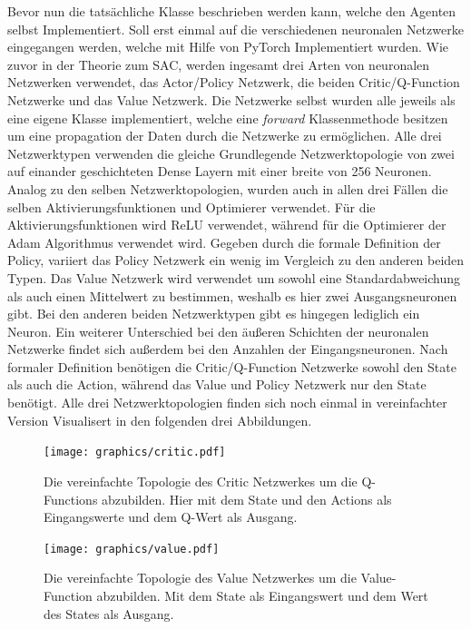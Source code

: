 \documentclass[]{iat}
\begin{document}
Bevor nun die tatsächliche Klasse beschrieben werden kann, welche den Agenten selbst Implementiert. Soll erst einmal auf die verschiedenen neuronalen Netzwerke eingegangen werden, welche mit Hilfe von PyTorch Implementiert wurden. Wie zuvor in der Theorie zum SAC, werden ingesamt drei Arten von neuronalen Netzwerken verwendet, das Actor/Policy Netzwerk, die beiden Critic/Q-Function Netzwerke und das Value Netzwerk. Die Netzwerke selbst wurden alle jeweils als eine eigene Klasse implementiert, welche eine \textit{forward} Klassenmethode besitzen um eine propagation der Daten durch die Netzwerke zu ermöglichen. Alle drei Netzwerktypen verwenden die gleiche Grundlegende Netzwerktopologie von zwei auf einander geschichteten Dense Layern mit einer breite von 256 Neuronen. Analog zu den selben Netzwerktopologien, wurden auch in allen drei Fällen die selben Aktivierungsfunktionen und Optimierer verwendet. Für die Aktivierungsfunktionen wird ReLU verwendet, während für die Optimierer der Adam Algorithmus \cite[]{kingma2014method} verwendet wird. Gegeben durch die formale Definition der Policy, variiert das Policy Netzwerk ein wenig im Vergleich zu den anderen beiden Typen. Das Value Netzwerk wird verwendet um sowohl eine Standardabweichung als auch einen Mittelwert zu bestimmen, weshalb es hier zwei Ausgangsneuronen gibt. Bei den anderen beiden Netzwerktypen gibt es hingegen lediglich ein Neuron. Ein weiterer Unterschied bei den äußeren Schichten der neuronalen Netzwerke findet sich außerdem bei den Anzahlen der Eingangsneuronen. Nach formaler Definition benötigen die Critic/Q-Function Netzwerke sowohl den State als auch die Action, während das Value und Policy Netzwerk nur den State benötigt. Alle drei Netzwerktopologien finden sich noch einmal in vereinfachter Version Visualisert in den folgenden drei Abbildungen.

\begin{figure}[H]
    \texttt{[image: graphics/critic.pdf]}
    \centering
    \caption{Die vereinfachte Topologie des Critic Netzwerkes um die Q-Functions abzubilden. Hier mit dem State und den Actions als Eingangswerte und dem Q-Wert als Ausgang.}
    \label{abb:critic_network}
\end{figure}

\begin{figure}[H]
    \texttt{[image: graphics/value.pdf]}
    \centering
    \caption{Die vereinfachte Topologie des Value Netzwerkes um die Value-Function abzubilden. Mit dem State als Eingangswert und dem Wert des States als Ausgang.}
    \label{abb:value_network}
\end{figure}
\end{document}
